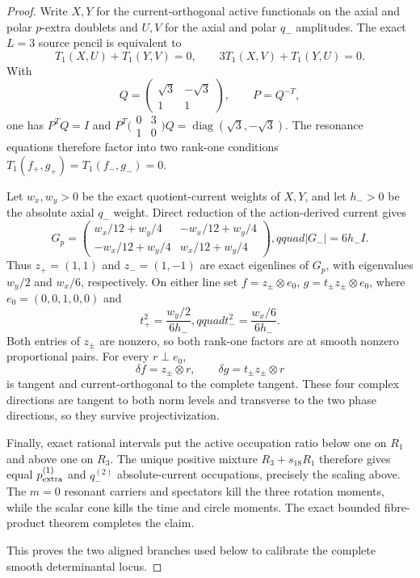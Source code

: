 \documentclass[11pt]{article}
\theoremstyle{definition}
\theoremstyle{remark}
\begin{document}
\begin{proof}
Write \(X,Y\) for the current-orthogonal active functionals on the axial and
polar \(p\)-extra doublets and \(U,V\) for the axial and polar \(q_-\)
amplitudes.  The exact \(L=3\) source pencil is equivalent to
\[
 T_1(X,U)+T_1(Y,V)=0,\qquad
 3T_1(X,V)+T_1(Y,U)=0.
\]
With
\[
 Q=\begin{pmatrix}\sqrt3&-\sqrt3\\1&1\end{pmatrix},
 \qquad P=Q^{-T},
\]
one has \(P^TQ=I\) and
\(P^T\bigl(\begin{smallmatrix}0&3\\1&0\end{smallmatrix}\bigr)Q
=\operatorname{diag}(\sqrt3,-\sqrt3)\).  The resonance equations therefore
factor into two rank-one conditions
\(T_1(f_+,g_+)=T_1(f_-,g_-)=0\).

Let \(w_x,w_y>0\) be the exact quotient-current weights of \(X,Y\), and let
\(h_->0\) be the absolute axial \(q_-\) weight.  Direct reduction of the
action-derived current gives
\[
 G_p=\begin{pmatrix}
 w_x/12+w_y/4&-w_x/12+w_y/4\\
 -w_x/12+w_y/4&w_x/12+w_y/4
 \end{pmatrix},qquad
 |G_-|=6h_-I.
\]
Thus \(z_+=(1,1)\) and \(z_-=(1,-1)\) are exact eigenlines of \(G_p\),
with eigenvalues \(w_y/2\) and \(w_x/6\), respectively.  On either line set
\(f=z_\pm\otimes e_0\), \(g=t_\pm z_\pm\otimes e_0\), where
\(e_0=(0,0,1,0,0)\) and
\[
 t_+^2=\frac{w_y/2}{6h_-},qquad
 t_-^2=\frac{w_x/6}{6h_-}.
\]
Both entries of \(z_\pm\) are nonzero, so both rank-one factors are at smooth
nonzero proportional pairs.  For every \(r\perp e_0\),
\[
 \delta f=z_\pm\otimes r,\qquad
 \delta g=t_\pm z_\pm\otimes r
\]
is tangent and current-orthogonal to the complete tangent.  These four
complex directions are tangent to both norm levels and transverse to the
two phase directions, so they survive projectivization.

Finally, exact rational intervals put the active occupation ratio below one
on \(R_1\) and above one on \(R_3\).  The unique positive mixture
\(R_3+s_{18}R_1\) therefore gives equal \(p_{\rm extra}^{(1)}\) and
\(q_-^{(2)}\) absolute-current occupations, precisely the scaling above.
The \(m=0\) resonant carriers and spectators kill the three rotation moments,
while the scalar cone kills the time and circle moments.  The exact bounded
fibre-product theorem completes the claim.

This proves the two aligned branches used below to calibrate the complete
smooth determinantal locus.
\end{proof}
\end{document}
